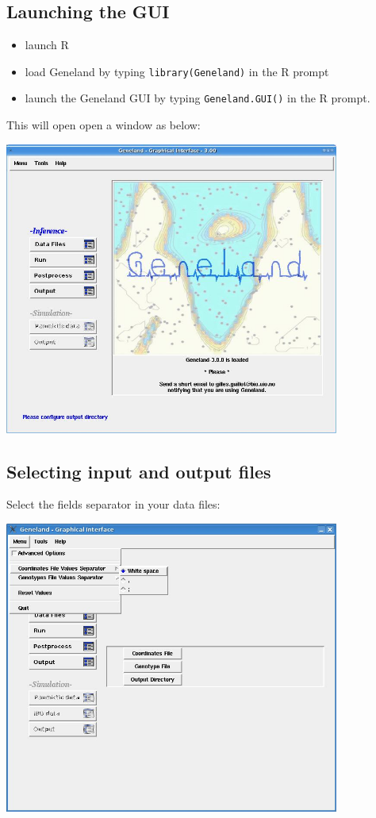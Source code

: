 \documentclass{article}
\begin{document}
\subsection{Launching the GUI}

\begin{itemize}
\item launch R
\item load {\sc Geneland} by typing \texttt{library(Geneland)} in the R prompt
\item launch the {\sc Geneland} GUI by typing \texttt{Geneland.GUI()} in the R prompt.
\end{itemize}

This will open open a window as below:\\

\centerline{\includegraphics[width=11cm]{../inst/images/initial.jpg}}

\clearpage
\subsection{Selecting input and output files}


Select the fields separator in your data files:\\

\centerline{\includegraphics[width=11cm]{../inst/images/choosesep.jpg}}
\end{document}
